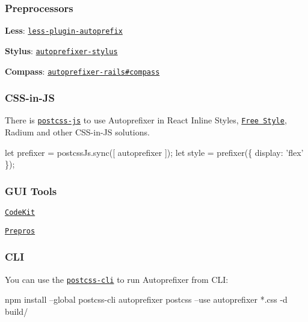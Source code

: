 \subsubsection*{Preprocessors}


\begin{DoxyItemize}
\item {\bfseries Less}\+: \href{https://github.com/less/less-plugin-autoprefix}{\tt less-\/plugin-\/autoprefix}
\item {\bfseries Stylus}\+: \href{https://github.com/jenius/autoprefixer-stylus}{\tt autoprefixer-\/stylus}
\item {\bfseries Compass}\+: \href{https://github.com/ai/autoprefixer-rails#compass}{\tt autoprefixer-\/rails\#compass}
\end{DoxyItemize}

\subsubsection*{C\+S\+S-\/in-\/\+JS}

There is \href{https://github.com/postcss/postcss-js}{\tt postcss-\/js} to use Autoprefixer in React Inline Styles, \href{https://github.com/blakeembrey/free-style}{\tt Free Style}, Radium and other C\+S\+S-\/in-\/\+JS solutions.


\begin{DoxyCode}
let prefixer = postcssJs.sync([ autoprefixer ]);
let style = prefixer(\{
    display: 'flex'
\});
\end{DoxyCode}


\subsubsection*{G\+UI Tools}


\begin{DoxyItemize}
\item \href{https://incident57.com/codekit/help.html#autoprefixer}{\tt Code\+Kit}
\item \href{https://prepros.io}{\tt Prepros}
\end{DoxyItemize}

\subsubsection*{C\+LI}

You can use the \href{https://github.com/postcss/postcss-cli}{\tt postcss-\/cli} to run Autoprefixer from C\+LI\+:


\begin{DoxyCode}
npm install --global postcss-cli autoprefixer
postcss --use autoprefixer *.css -d build/
\end{DoxyCode}


